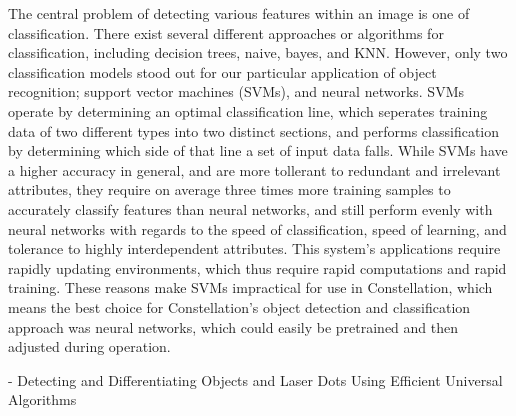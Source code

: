 The central problem of detecting various features within an image is one of classification. There exist several different approaches or algorithms for classification, including decision trees, naive, bayes, and KNN. However, only two classification models stood out for our particular application of object recognition; support vector machines (SVMs), and neural networks. SVMs operate by determining an optimal classification line, which seperates training data of two different types into two distinct sections, and performs classification by determining which side of that line a set of input data falls. While SVMs have a higher accuracy in general, and are more tollerant to redundant and irrelevant attributes, they require on average three times more training samples to accurately classify features than neural networks, and still perform evenly with neural networks with regards to the speed of classification, speed of learning, and tolerance to highly interdependent attributes. This system's applications require rapidly updating environments, which thus require rapid computations and rapid training. These reasons make SVMs impractical for use in Constellation, which means the best choice for Constellation's object detection and classification approach was neural networks, which could easily be pretrained and then adjusted during operation.

- Detecting and Differentiating Objects and Laser Dots Using Efficient Universal Algorithms